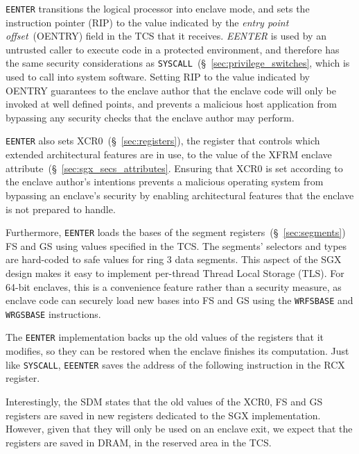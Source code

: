\texttt{EENTER} transitions the logical processor into enclave mode, and sets
the instruction pointer (RIP) to the value indicated by the \textit{entry point
offset}~(OENTRY) field in the TCS that it receives. \textit{EENTER} is used by
an untrusted caller to execute code in a protected environment, and therefore
has the same security considerations as
\texttt{SYSCALL}~(\S~\ref{sec:privilege_switches}, which is used to call into
system software. Setting RIP to the value indicated by OENTRY guarantees to the
enclave author that the enclave code will only be invoked at well defined
points, and prevents a malicious host application from bypassing any security
checks that the enclave author may perform.


\texttt{EENTER} also sets XCR0~(\S~\ref{sec:registers}), the register that
controls which extended architectural features are in use, to the value of the
XFRM enclave attribute~(\S~\ref{sec:sgx_secs_attributes}. Ensuring that XCR0 is
set according to the enclave author's intentions prevents a malicious operating
system from bypassing an enclave's security by enabling architectural features
that the enclave is not prepared to handle.

Furthermore, \texttt{EENTER} loads the bases of the segment
registers~(\S~\ref{sec:segments}) FS and GS using values specified in the TCS.
The segments' selectors and types are hard-coded to safe values for ring 3 data
segments. This aspect of the SGX design makes it easy to implement per-thread
Thread Local Storage (TLS). For 64-bit enclaves, this is a convenience feature
rather than a security measure, as enclave code can securely load new bases
into FS and GS using the \texttt{WRFSBASE} and \texttt{WRGSBASE} instructions.

The \texttt{EENTER} implementation backs up the old values of the registers
that it modifies, so they can be restored when the enclave finishes its
computation. Just like \texttt{SYSCALL}, \texttt{EEENTER} saves the address of
the following instruction in the RCX register.

Interestingly, the SDM states that the old values of the XCR0, FS and GS
registers are saved in new registers dedicated to the SGX implementation.
However, given that they will only be used on an enclave exit, we expect that
the registers are saved in DRAM, in the reserved area in the TCS.

